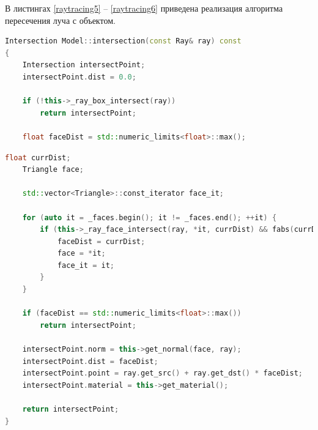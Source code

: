 В листингах \ref{raytracing5} -- \ref{raytracing6}   приведена реализация алгоритма пересечения луча с объектом.

\begin{lstlisting}[label=raytracing5,caption=Реализация алгоритма пересечения луча с объектом (начало), language=C++]
Intersection Model::intersection(const Ray& ray) const
{
	Intersection intersectPoint;
	intersectPoint.dist = 0.0;
	
	if (!this->_ray_box_intersect(ray))
		return intersectPoint;
	
	float faceDist = std::numeric_limits<float>::max();
\end{lstlisting}
\begin{lstlisting}[label=raytracing6,caption=Реализация алгоритма пересечения луча с объектом (окончание), language=C++]
	float currDist;
	Triangle face;
	
	std::vector<Triangle>::const_iterator face_it;
	
	for (auto it = _faces.begin(); it != _faces.end(); ++it) {
		if (this->_ray_face_intersect(ray, *it, currDist) && fabs(currDist) < faceDist) {
			faceDist = currDist;
			face = *it;
			face_it = it;
		}
	}
	
	if (faceDist == std::numeric_limits<float>::max())
		return intersectPoint;
	
	intersectPoint.norm = this->get_normal(face, ray);
	intersectPoint.dist = faceDist;
	intersectPoint.point = ray.get_src() + ray.get_dst() * faceDist;
	intersectPoint.material = this->get_material();
	
	return intersectPoint;
}
\end{lstlisting}

